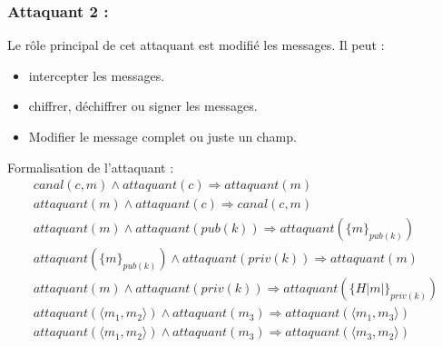 \documentclass[10pt,a4paper]{article}
\begin{document}
\subsubsection{Attaquant 2 :}
Le rôle principal de cet attaquant est modifié les messages. Il peut :
\begin{itemize}
\item intercepter les messages.
\item chiffrer, déchiffrer ou signer les messages.
\item Modifier le message complet ou juste un champ.\\
\end{itemize}
Formalisation de l'attaquant :   
\[
\begin{array}{l}
canal(c,m)\wedge attaquant(c)\Longrightarrow attaquant(m)\\
attaquant(m)\wedge attaquant(c)\Longrightarrow canal(c,m)\\
attaquant(m)\wedge attaquant(pub(k))\Longrightarrow attaquant({\lbrace m\rbrace}_{pub(k)})
\\
attaquant({\lbrace m\rbrace}_{pub(k)}) \wedge attaquant(priv(k))\Longrightarrow attaquant(m) 
\\ 
attaquant(m)\wedge attaquant(priv(k))\Longrightarrow attaquant({\lbrace H|m|\rbrace}_{priv(k)})
\\
attaquant(\langle m_{1},m_{2}\rangle)\wedge attaquant(m_{3})\Longrightarrow attaquant(\langle m_{1},m_{3}\rangle)\\ 
attaquant(\langle m_{1},m_{2}\rangle)\wedge attaquant(m_{3})\Longrightarrow attaquant(\langle m_{3},m_{2}\rangle)\\ 
  
  \end{array}
\]
\end{document}
